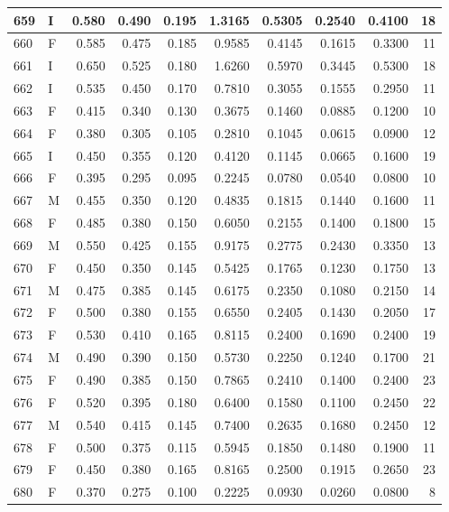 \documentclass[9pt,twocolumn,twoside,]{pnas-new}
\begin{document}
\begin{tabular}{l|l|r|r|r|r|r|r|r|r}
\hline
659 & I & 0.580 & 0.490 & 0.195 & 1.3165 & 0.5305 & 0.2540 & 0.4100 & 18\\
\hline
660 & F & 0.585 & 0.475 & 0.185 & 0.9585 & 0.4145 & 0.1615 & 0.3300 & 11\\
\hline
661 & I & 0.650 & 0.525 & 0.180 & 1.6260 & 0.5970 & 0.3445 & 0.5300 & 18\\
\hline
662 & I & 0.535 & 0.450 & 0.170 & 0.7810 & 0.3055 & 0.1555 & 0.2950 & 11\\
\hline
663 & F & 0.415 & 0.340 & 0.130 & 0.3675 & 0.1460 & 0.0885 & 0.1200 & 10\\
\hline
664 & F & 0.380 & 0.305 & 0.105 & 0.2810 & 0.1045 & 0.0615 & 0.0900 & 12\\
\hline
665 & I & 0.450 & 0.355 & 0.120 & 0.4120 & 0.1145 & 0.0665 & 0.1600 & 19\\
\hline
666 & F & 0.395 & 0.295 & 0.095 & 0.2245 & 0.0780 & 0.0540 & 0.0800 & 10\\
\hline
667 & M & 0.455 & 0.350 & 0.120 & 0.4835 & 0.1815 & 0.1440 & 0.1600 & 11\\
\hline
668 & F & 0.485 & 0.380 & 0.150 & 0.6050 & 0.2155 & 0.1400 & 0.1800 & 15\\
\hline
669 & M & 0.550 & 0.425 & 0.155 & 0.9175 & 0.2775 & 0.2430 & 0.3350 & 13\\
\hline
670 & F & 0.450 & 0.350 & 0.145 & 0.5425 & 0.1765 & 0.1230 & 0.1750 & 13\\
\hline
671 & M & 0.475 & 0.385 & 0.145 & 0.6175 & 0.2350 & 0.1080 & 0.2150 & 14\\
\hline
672 & F & 0.500 & 0.380 & 0.155 & 0.6550 & 0.2405 & 0.1430 & 0.2050 & 17\\
\hline
673 & F & 0.530 & 0.410 & 0.165 & 0.8115 & 0.2400 & 0.1690 & 0.2400 & 19\\
\hline
674 & M & 0.490 & 0.390 & 0.150 & 0.5730 & 0.2250 & 0.1240 & 0.1700 & 21\\
\hline
675 & F & 0.490 & 0.385 & 0.150 & 0.7865 & 0.2410 & 0.1400 & 0.2400 & 23\\
\hline
676 & F & 0.520 & 0.395 & 0.180 & 0.6400 & 0.1580 & 0.1100 & 0.2450 & 22\\
\hline
677 & M & 0.540 & 0.415 & 0.145 & 0.7400 & 0.2635 & 0.1680 & 0.2450 & 12\\
\hline
678 & F & 0.500 & 0.375 & 0.115 & 0.5945 & 0.1850 & 0.1480 & 0.1900 & 11\\
\hline
679 & F & 0.450 & 0.380 & 0.165 & 0.8165 & 0.2500 & 0.1915 & 0.2650 & 23\\
\hline
680 & F & 0.370 & 0.275 & 0.100 & 0.2225 & 0.0930 & 0.0260 & 0.0800 & 8\\

\end{tabular}
\end{document}
